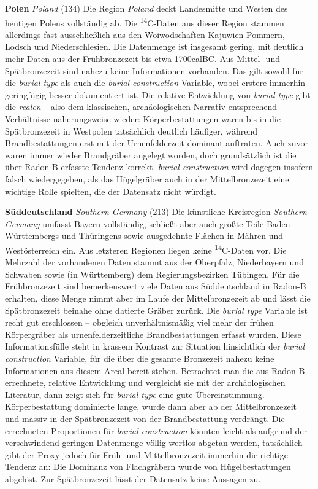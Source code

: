 \documentclass[openany,twoside,twocolumn]{book}
\begin{document}
\textbf{Polen} \emph{Poland} (134) \newline 
Die Region \emph{Poland} deckt Landesmitte und Westen des heutigen Polens vollständig ab. Die \textsuperscript{14}C-Daten aus dieser Region stammen allerdings fast ausschließlich aus den Woiwodschaften Kajuwien-Pommern, Lodsch und Niederschlesien. Die Datenmenge ist insgesamt gering, mit deutlich mehr Daten aus der Frühbronzezeit bis etwa 1700calBC. Aus Mittel- und Spätbronzezeit sind nahezu keine Informationen vorhanden. Das gilt sowohl für die \emph{burial type} als auch die \emph{burial construction} Variable, wobei erstere immerhin geringfügig besser dokumentiert ist. Die relative Entwicklung von \emph{burial type} gibt die \emph{realen} -- also dem klassischen, archäologischen Narrativ entsprechend -- Verhältnisse näherungsweise wieder: Körperbestattungen waren bis in die Spätbronzezeit in Westpolen tatsächlich deutlich häufiger, während Brandbestattungen erst mit der Urnenfelderzeit dominant auftraten. Auch zuvor waren immer wieder Brandgräber angelegt worden, doch grundsätzlich ist die über Radon-B erfasste Tendenz korrekt. \emph{burial construction} wird dagegen insofern falsch wiedergegeben, als das Hügelgräber auch in der Mittelbronzezeit eine wichtige Rolle spielten, die der Datensatz nicht würdigt.

\textbf{Süddeutschland} \emph{Southern Germany} (213) \newline 
Die künstliche Kreisregion \emph{Southern Germany} umfasst Bayern vollständig, schließt aber auch größte Teile Baden-Württembergs und Thüringens sowie ausgedehnte Flächen in Mähren und Westösterreich ein. Aus letzteren Regionen liegen keine \textsuperscript{14}C-Daten vor. Die Mehrzahl der vorhandenen Daten stammt aus der Oberpfalz, Niederbayern und Schwaben sowie (in Württemberg) dem Regierungsbezirken Tübingen. Für die Frühbronzezeit sind bemerkenswert viele Daten aus Süddeutschland in Radon-B erhalten, diese Menge nimmt aber im Laufe der Mittelbronzezeit ab und lässt die Spätbronzezeit beinahe ohne datierte Gräber zurück. Die \emph{burial type} Variable ist recht gut erschlossen -- obgleich unverhältnismäßig viel mehr der frühen Körpergräber als urnenfelderzeitliche Brandbestattungen erfasst wurden. Diese Informationsfülle steht in krassem Kontrast zur Situation hinsichtlich der \emph{burial construction} Variable, für die über die gesamte Bronzezeit nahezu keine Informationen aus diesem Areal bereit stehen. Betrachtet man die aus Radon-B errechnete, relative Entwicklung und vergleicht sie mit der archäologischen Literatur, dann zeigt sich für \emph{burial type} eine gute Übereinstimmung. Körperbestattung dominierte lange, wurde dann aber ab der Mittelbronzezeit und massiv in der Spätbronzezeit von der Brandbestattung verdrängt. Die errechneten Proportionen für \emph{burial construction} könnten leicht als aufgrund der verschwindend geringen Datenmenge völlig wertlos abgetan werden, tatsächlich gibt der Proxy jedoch für Früh- und Mittelbronzezeit immerhin die richtige Tendenz an: Die Dominanz von Flachgräbern wurde von Hügelbestattungen abgelöst. Zur Spätbronzezeit lässt der Datensatz keine Aussagen zu.
\end{document}
